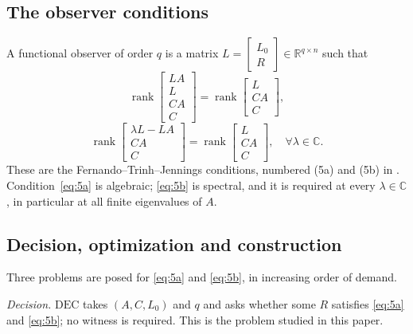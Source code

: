 ﻿\documentclass[journal]{IEEEtran}
\theoremstyle{plainn}
\theoremstyle{remark}
\begin{document}
\subsection{The observer conditions}\label{sec:conditions}

A functional observer of order $q$ is a matrix $L=\begin{bmatrix}L_0 \\ R\end{bmatrix}\in\mathbb R^{q\times n}$ such
that
\begin{equation}\label{eq:5a}
\operatorname{rank}\begin{bmatrix}LA\\ L\\ CA\\ C\end{bmatrix}
=\operatorname{rank}\begin{bmatrix}L\\ CA\\ C\end{bmatrix},
\end{equation}
\begin{equation}\label{eq:5b}
\operatorname{rank}\begin{bmatrix}\lambda L-LA\\ CA\\ C\end{bmatrix}
=\operatorname{rank}\begin{bmatrix}L\\ CA\\ C\end{bmatrix},
\quad \forall\lambda\in\mathbb C.
\end{equation}
These are the Fernando--Trinh--Jennings conditions, numbered (5a) and (5b) in
\cite{fer10}. Condition~\eqref{eq:5a} is algebraic; \eqref{eq:5b} is spectral, and it is
required at every $\lambda\in\mathbb C$, in particular at all finite eigenvalues of $A$.

\subsection{Decision, optimization and construction}\label{sec:problems}

Three problems are posed for \eqref{eq:5a} and \eqref{eq:5b}, in increasing order of
demand.

\emph{Decision.} $\mathrm{DEC}$ takes $(A,C,L_0)$ and $q$ and asks whether some $R$
satisfies \eqref{eq:5a} and \eqref{eq:5b}; no witness is required. This is the problem
studied in this paper.
\end{document}
